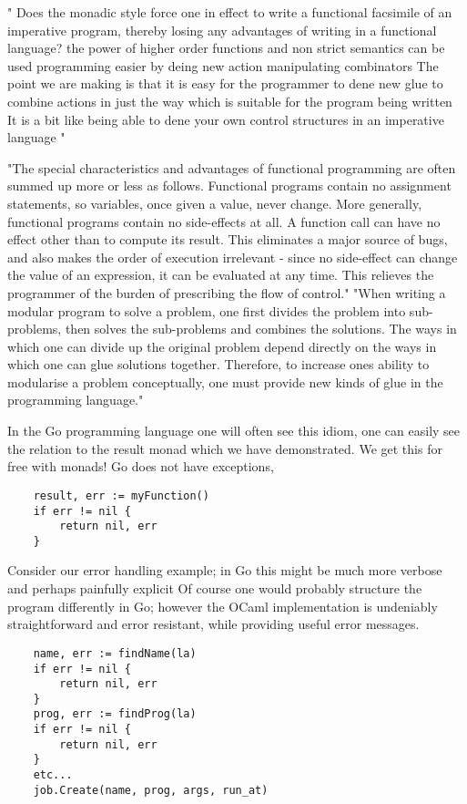 "
Does the monadic style force one in effect to write a functional facsimile of an
imperative program, thereby losing any advantages of writing in a functional language?
the power of higher order functions and non strict semantics can be used
programming easier by deing new action manipulating combinators
The point we are making is that it is easy for the programmer to dene new glue to
combine actions in just the way which is suitable for the program being written
It is a bit like being able to dene your own control structures in an imperative language
"\cite{PeytonJones:1993}

"The special characteristics and advantages of functional programming are often summed up more or less as follows.
Functional programs contain no assignment statements, so variables,
once given a value, never change.
More generally, functional programs contain no side-effects at all.
A function call can have no effect other than to compute its result.
This eliminates a major source of bugs,
and also makes the order of execution irrelevant - since no side-effect
can change the value of an expression,
it can be evaluated at any time.
This relieves the programmer of the burden of prescribing the flow of control."
"When writing a modular program to solve a problem, one first divides the problem into sub- problems, then solves the sub-problems and combines the solutions. The ways in which one can divide up the original problem depend directly on the ways in which one can glue solutions together. Therefore, to increase ones ability to modularise a problem conceptually, one must provide new kinds of glue in the programming language."
\cite{hughes1989functional}

In the Go programming language one will often see this idiom,
one can easily see the relation to the result monad which we
have demonstrated.
We get this for free with monads!
Go does not have exceptions,

\begin{verbatim}
    result, err := myFunction()
    if err != nil {
        return nil, err
    }
\end{verbatim}

Consider our error handling example;
in Go this might be much more verbose
and perhaps painfully explicit
Of course one would probably structure the program differently in Go;
however the OCaml implementation is undeniably straightforward
and error resistant, while providing useful error messages.

\begin{verbatim}
    name, err := findName(la)
    if err != nil {
        return nil, err
    }
    prog, err := findProg(la)
    if err != nil {
        return nil, err
    }
    etc...
    job.Create(name, prog, args, run_at)
\end{verbatim}

